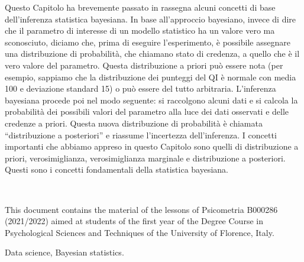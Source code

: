 \documentclass[
  11pt,
  italian,
  a4paper,
  extrafontsizes,onecolumn,openright
  ]{memoir}
\makeatletter
\newcommand{\MemoirChapStyle}{daleif1}
\newcommand{\MemoirPageStyle}{Ruled}
\newlength\widthw %
\newcommand*{\SmallMargins}{
  \setlrmarginsandblock{1.5in}{1.5in}{*}
  \setmarginnotes{0.1in}{0.1in}{0.1in}
 \setulmarginsandblock{1.5in}{1in}{*}
  \checkandfixthelayout
  \ch@ngetext
  \clearpage
  \setlength{\widthw}{\textwidth+\marginparsep+\marginparwidth}
  \footnotesatfoot
  \chapterstyle{\MemoirChapStyle}  %
  \pagestyle{\MemoirPageStyle}
}
\newcommand{\LargeMargins}{\SmallMargins}
\newcommand{\evenpage}{
  \clearpage
  \strictpagecheck %
  \checkoddpage
  \ifoddpage
    \thispagestyle{empty}
    ~\\ %
    \newpage
  \else
  \fi
}
\makeatother
\begin{document}
Questo Capitolo ha brevemente passato in rassegna alcuni concetti di base dell'inferenza statistica bayesiana. In base all'approccio bayesiano, invece di dire che il parametro di interesse di un modello statistico ha un valore vero ma sconosciuto, diciamo che, prima di eseguire l'esperimento, è possibile assegnare una distribuzione di probabilità, che chiamano stato di credenza, a quello che è il vero valore del parametro. Questa distribuzione a priori può essere nota (per esempio, sappiamo che la distribuzione dei punteggi del QI è normale con media 100 e deviazione standard 15) o può essere del tutto arbitraria. L'inferenza bayesiana procede poi nel modo seguente: si raccolgono alcuni dati e si calcola la probabilità dei possibili valori del parametro alla luce dei dati osservati e delle credenze a priori. Questa nuova distribuzione di probabilità è chiamata ``distribuzione a posteriori'' e riassume l'incertezza dell'inferenza. I concetti importanti che abbiamo appreso in questo Capitolo sono quelli di distribuzione a priori, verosimiglianza, verosimiglianza marginale e distribuzione a posteriori. Questi sono i concetti fondamentali della statistica bayesiana.



\backmatter
\SmallMargins

\printbibliography
\onecolumn




\cleardoublepage
\LargeMargins
\listoffigures







\evenpage
\SmallMargins
\thispagestyle{empty}

\begin{normalsize}

\begin{description}

\item[Abstract]
This document contains the material of the lessons of Psicometria B000286 (2021/2022) aimed at students of the first year of the Degree Course in Psychological Sciences and Techniques of the University of Florence, Italy.
\item[Keywords]
Data science, Bayesian statistics.
~\\

\end{description}

\end{normalsize}
\end{document}
